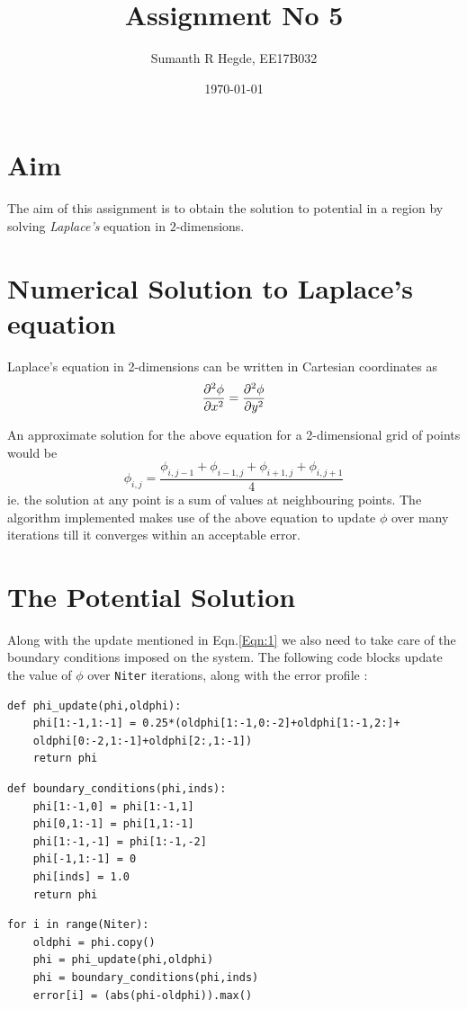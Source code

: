 \documentclass[11pt, a4paper]{article}
\title{Assignment No 5} %
\author{Sumanth R Hegde, EE17B032} %
\date{\today} %
\begin{document}
		
		
\maketitle %

\section*{Aim}
The aim of this assignment is to obtain the solution to potential in a region  by solving\textit{ Laplace's}  equation in $2$-dimensions.  

\section*{Numerical Solution to Laplace's equation}

Laplace's equation in 2-dimensions can  be written in Cartesian coordinates as 
\begin{equation}
\label{Eqn:1}
 \pdv[2]{\phi}{x} = \pdv[2]{\phi}{y} 
\end{equation}


An approximate solution for the above equation for a 2-dimensional grid of points would be 
\begin{equation*}
\phi_{i,j} = \frac{\phi_{i,j-1}+\phi_{i-1,j}+\phi_{i+1,j}+\phi_{i,j+1}}{4} 
\end{equation*}ie. the solution at any point is a sum of values at neighbouring points. The algorithm implemented makes use of the above equation to update $\phi$  over many iterations till it converges within an acceptable error.

\section*{The Potential Solution}
Along with the update mentioned in Eqn.\ref{Eqn:1}  we also need to take care of the boundary conditions imposed on the system. The following code blocks update the value of $\phi$ over \texttt{Niter} iterations, along with the error profile :
\begin{verbatim}
def phi_update(phi,oldphi):
    phi[1:-1,1:-1] = 0.25*(oldphi[1:-1,0:-2]+oldphi[1:-1,2:]+ 
    oldphi[0:-2,1:-1]+oldphi[2:,1:-1]) 
    return phi
 \end{verbatim}
 \begin{verbatim}
def boundary_conditions(phi,inds):
    phi[1:-1,0] = phi[1:-1,1]
    phi[0,1:-1] = phi[1,1:-1]
    phi[1:-1,-1] = phi[1:-1,-2]
    phi[-1,1:-1] = 0
    phi[inds] = 1.0
    return phi
\end{verbatim}
\begin{verbatim}
for i in range(Niter):
    oldphi = phi.copy()
    phi = phi_update(phi,oldphi)
    phi = boundary_conditions(phi,inds)
    error[i] = (abs(phi-oldphi)).max()
\end{verbatim}
\end{document}
